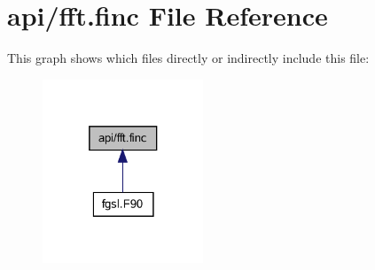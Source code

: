 \hypertarget{fft_8finc}{}\section{api/fft.finc File Reference}
\label{fft_8finc}
This graph shows which files directly or indirectly include this file\+:\nopagebreak
\begin{figure}[H]
\begin{center}
\leavevmode
\includegraphics[width=136pt]{fft_8finc__dep__incl}
\end{center}
\end{figure}
